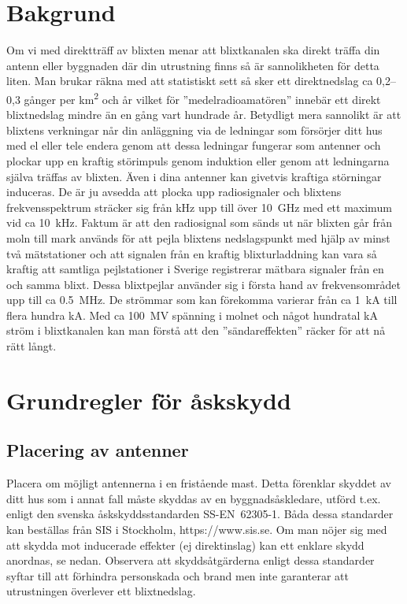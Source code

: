 \section{Bakgrund}
Om vi med direktträff av blixten menar att blixtkanalen ska direkt träffa din
antenn eller byggnaden där din utrustning finns så är sannolikheten för detta
liten.
Man brukar räkna med att statistiskt sett så sker ett direktnedslag ca 0,2--0,3
gånger per \unit{\kilo\metre\squared} och år vilket för ''medelradioamatören''
innebär ett direkt blixtnedslag mindre än en gång vart hundrade år.
Betydligt mera sannolikt är att blixtens verkningar når din anläggning via de
ledningar som försörjer ditt hus med el eller tele endera genom att dessa
ledningar fungerar som antenner och plockar upp en kraftig störimpuls genom
induktion eller genom att ledningarna själva träffas av blixten.
Även i dina antenner kan givetvis kraftiga störningar induceras.
De är ju avsedda att plocka upp radiosignaler och blixtens frekvensspektrum
sträcker sig från \unit{\kilo\hertz} upp till över \qty{10}{\giga\hertz} med ett
maximum vid ca \qty{10}{\kilo\hertz}.
Faktum är att den radiosignal som sänds ut när blixten går från moln till mark
används för att pejla blixtens nedslagspunkt med hjälp av minst två mätstationer
och att signalen från en kraftig blixturladdning kan vara så kraftig att
samtliga pejlstationer i Sverige registrerar mätbara signaler från en och samma
blixt.
Dessa blixtpejlar använder sig i första hand av frekvensområdet upp till ca
\qty{0,5}{\mega\hertz}.
De strömmar som kan förekomma varierar från ca \qty{1}{\kilo\ampere} till flera
hundra \unit{\kilo\ampere}.
Med ca \qty{100}{\mega\volt} spänning i molnet och något hundratal
\unit{\kilo\ampere} ström i blixtkanalen kan man förstå att den
''sändareffekten'' räcker för att nå rätt långt.

\section{Grundregler för åskskydd}
\subsection{Placering av antenner}
Placera om möjligt antennerna i en fristående mast.
Detta förenklar skyddet av ditt hus som i annat fall måste skyddas av en
byggnadsåskledare, utförd t.ex. enligt den svenska åskskyddsstandarden
SS-EN~62305-1.
Båda dessa standarder kan beställas från SIS i Stockholm, https://www.sis.se.
Om man nöjer sig med att skydda mot inducerade effekter (ej direktinslag) kan
ett enklare skydd anordnas, se nedan.
Observera att skyddsåtgärderna enligt dessa standarder syftar till att förhindra
personskada och brand men inte garanterar att utrustningen överlever ett
blixtnedslag.

